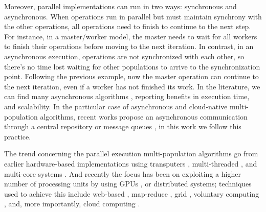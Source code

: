 \documentclass[review]{elsarticle}
\begin{document}
Moreover, parallel implementations can run in two ways: synchronous and
asynchronous. When operations run in parallel but must maintain synchrony with
the other operations,  all operations need to finish to continue to the next
step. For instance, in a  master/worker model, the master needs to wait for all
workers to finish their operations before moving to the next iteration.  In
contrast, in an asynchronous execution,  operations are not synchronized with
each other, so there's no time lost waiting for other populations to
arrive to the synchronization point. Following the previous example, now the master operation can
continue to the next iteration, even if a worker has not finished its work.  In
the literature, we can find many asynchronous algorithms
\cite{coleman89,baugh2003asynchronous}, reporting benefits in execution time,
and scalability. In the particular case of asynchronous and cloud-native
multi-population algorithms, recent works propose an asynchronous communication
through a central repository \cite{sofea:cec2012, JSON} or message queues
\cite{salza2019speed, guervos2018introducing}, in this work we follow this
practice.

The trend concerning the parallel execution multi-population algorithms go from
earlier hardware-based implementations using transputers
\cite{gorges1990explicit}, multi-threaded \cite{merelo2019scaling}, and
multi-core systems \cite{Serrano2008,lai2019adaptive}. %
And recently the focus has been on exploiting a higher number of processing
units by using GPUs \cite{tan2015survey,li2007efficient}, or distributed
systems; techniques used to achieve this include web-based \cite{JSON},
map-reduce \cite{fazenda2012},  grid \cite{munawar2010design,Gonzalez09},
voluntary computing \cite{MilkyWay}, and, more importantly, cloud computing
\cite{GValdez2015,salza2019speed,valenzuela2015implementing,FlexGP}. 
\end{document}

